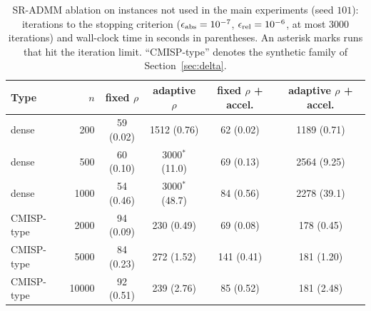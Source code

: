 
\begin{table}[H]\centering\small
	\caption{SR-ADMM ablation on instances not used in the main experiments (seed $101$): iterations to the stopping criterion ($\epsilon_{\rm abs}=10^{-7}$, $\epsilon_{\rm rel}=10^{-6}$, at most $3000$ iterations) and wall-clock time in seconds in parentheses. An asterisk marks runs that hit the iteration limit. ``CMISP-type'' denotes the synthetic family of Section~\ref{sec:delta}.}\label{tab:ablation}
	\begin{tabular}{lrcccc}\toprule
		Type & $n$ & fixed $\rho$ & adaptive $\rho$ & fixed $\rho$ + accel. & adaptive $\rho$ + accel. \\\midrule
		dense & 200 & 59 (0.02) & 1512 (0.76) & 62 (0.02) & 1189 (0.71) \\
		dense & 500 & 60 (0.10) & 3000$^*$ (11.0) & 69 (0.13) & 2564 (9.25) \\
		dense & 1000 & 54 (0.46) & 3000$^*$ (48.7) & 84 (0.56) & 2278 (39.1) \\
		CMISP-type & 2000 & 94 (0.09) & 230 (0.49) & 69 (0.08) & 178 (0.45) \\
		CMISP-type & 5000 & 84 (0.23) & 272 (1.52) & 141 (0.41) & 181 (1.20) \\
		CMISP-type & 10000 & 92 (0.51) & 239 (2.76) & 85 (0.52) & 181 (2.48) \\
		\bottomrule\end{tabular}
\end{table}
